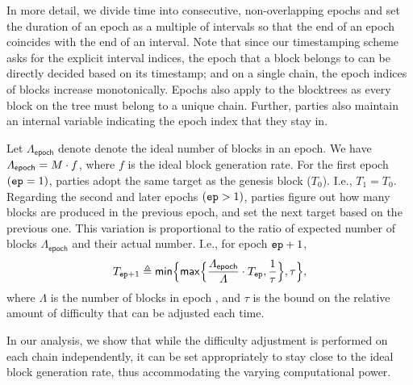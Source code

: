 In more detail, we divide time into consecutive, non-overlapping epochs and set the duration \epochLen of an epoch as a multiple of intervals so that the end of an epoch coincides with the end of an interval.
%
Note that since our timestamping scheme asks for the explicit interval indices, the epoch that a block belongs to can be directly decided based on its timestamp; and on a single chain, the epoch indices of blocks increase monotonically.
%
Epochs also apply to the blocktrees as every block on the tree must belong to a unique chain.
%
Further, parties also maintain an internal variable \epoch indicating the epoch index that they stay in.

Let $\varLambda_{\mathsf{epoch}}$ denote denote the ideal number of blocks in an epoch.
%
We have $\varLambda_{\mathsf{epoch}} = M \cdot f$, where $f$ is the ideal block generation rate.
%
For the first epoch $(\mathtt{ep} = 1)$, parties adopt the same target as
the genesis block ($T_0$).
%
I.e., $T_1 = T_0$.
%
Regarding the second and later epochs $(\mathtt{ep} > 1)$, parties figure out how many blocks are produced in the previous epoch, and set the next target based on the previous one.
%
This variation is proportional to the ratio of expected number of blocks $\varLambda_{\mathsf{epoch}}$ and their actual number.
%
I.e., for epoch $\mathtt{ep} + 1$,
%
\begin{equation} \label{eq:target-recalc}
      T_{\mathtt{ep} + 1} \triangleq \mathsf{min} \Big\{ \mathsf{max} \Big\{ \frac{\varLambda_{\mathsf{epoch}}}{\varLambda} \cdot T_{\mathtt{ep}}, \frac{1}{\tau} \Big\}, \tau \Big\},
\end{equation}
%
where $\varLambda$ is the number of blocks in epoch \epoch, and $\tau$ is the bound on the relative amount of difficulty that can be adjusted each time.

In our analysis, we show that while the difficulty adjustment is performed on each chain independently, it can be set appropriately to stay close to the ideal block generation rate, thus accommodating the varying computational power.

